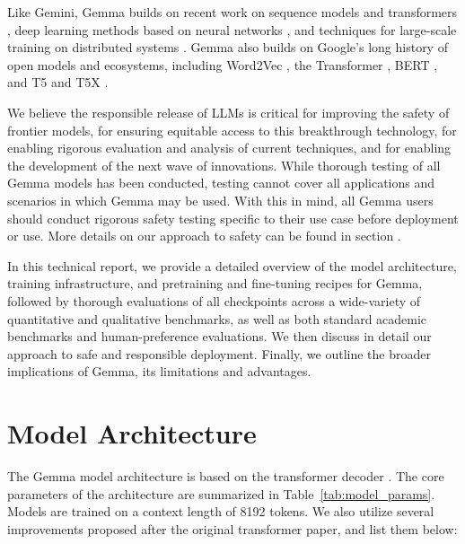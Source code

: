 \documentclass[11pt, a4paper, logo, twocolumn, copyright, nonumbering]{googledeepmind}
\begin{document}
Like Gemini, Gemma builds on recent work on sequence models \citep{DBLP:journals/corr/SutskeverVL14} and transformers \citep{DBLP:journals/corr/VaswaniSPUJGKP17}, deep learning methods based on neural networks \citep{deeplearningLeCun}, and techniques for large-scale training on distributed systems \citep{barham2022pathways, bradburyJAX, NIPS2012_6aca9700}. Gemma also builds on Google's long history of open models and ecosystems, including Word2Vec \citep{word2vec}, the Transformer \citep{DBLP:journals/corr/VaswaniSPUJGKP17}, BERT \citep{bert}, and T5 \citep{t5} and T5X \citep{t5x}.

We believe the responsible release of LLMs is critical for improving the safety of frontier models, for ensuring equitable access to this breakthrough technology, for enabling rigorous evaluation and analysis of current techniques, and for enabling the development of the next wave of innovations. While thorough testing of all Gemma models has been conducted, testing cannot cover all applications and scenarios in which Gemma may be used. With this in mind, all Gemma users should conduct rigorous safety testing specific to their use case before deployment or use. More details on our approach to safety can be found in section .

In this technical report, we provide a detailed overview of the model architecture, training infrastructure, and pretraining and fine-tuning recipes for Gemma, followed by thorough evaluations of all checkpoints across a wide-variety of quantitative and qualitative benchmarks, as well as both standard academic benchmarks and human-preference evaluations. We then discuss in detail our approach to safe and responsible deployment. Finally, we outline the broader implications of Gemma, its limitations and advantages.
% 
\section{Model Architecture}
% 
The Gemma model architecture is based on the transformer decoder \citep{DBLP:journals/corr/VaswaniSPUJGKP17}. The core parameters of the architecture are summarized in Table~\ref{tab:model_params}. Models are trained on a context length of 8192 tokens.
We also utilize several improvements proposed after the original transformer paper, and list them below:
\end{document}

